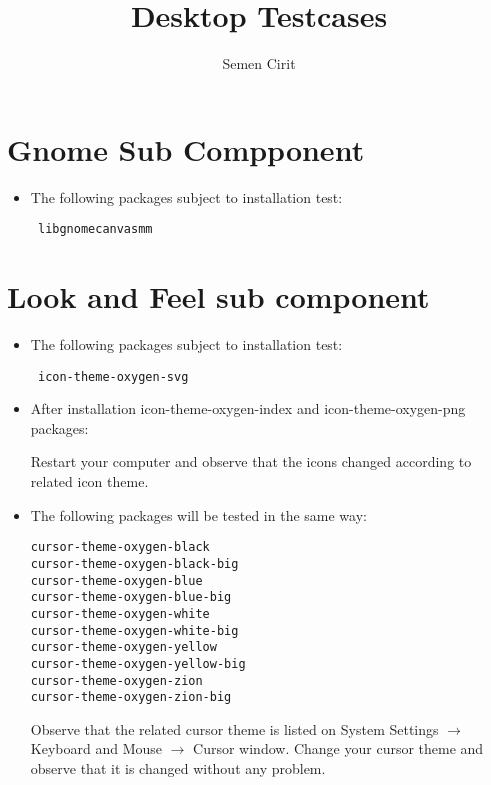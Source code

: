 \documentclass[a4paper,10pt]{article}
\title{Desktop Testcases}
\author{Semen Cirit}
\begin{document}
\maketitle
\section{Gnome Sub Compponent}
\begin{itemize}
 \item The following packages subject to installation test:
\begin{verbatim}
 libgnomecanvasmm
\end{verbatim}

\end{itemize}

\section{Look and Feel sub component}
\begin{itemize}
\item The following packages subject to installation test:
\begin{verbatim}
 icon-theme-oxygen-svg
\end{verbatim}
\item After installation icon-theme-oxygen-index and icon-theme-oxygen-png packages:

Restart your computer and observe that the icons changed according to related icon theme.

 \item The following packages will be tested in the same way:
\begin{verbatim}
cursor-theme-oxygen-black
cursor-theme-oxygen-black-big
cursor-theme-oxygen-blue
cursor-theme-oxygen-blue-big
cursor-theme-oxygen-white
cursor-theme-oxygen-white-big
cursor-theme-oxygen-yellow
cursor-theme-oxygen-yellow-big
cursor-theme-oxygen-zion
cursor-theme-oxygen-zion-big
\end{verbatim}

Observe that the related cursor theme is listed on System Settings $\rightarrow$  Keyboard and Mouse $\rightarrow$ Cursor window. Change your cursor theme and observe that it is changed without any problem.
\end{itemize}
\end{document}
